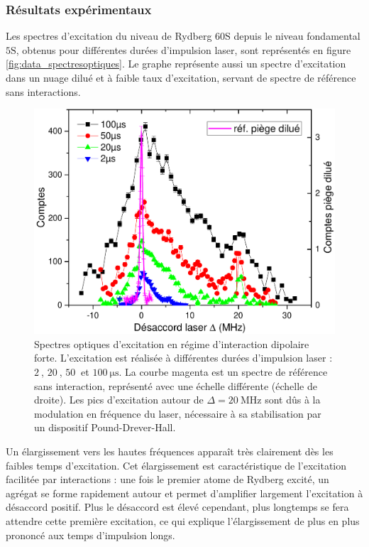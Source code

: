 		\subsubsection*{Résultats expérimentaux}
\noindent Les spectres d'excitation du niveau de Rydberg $\mathrm{60S}$ depuis le niveau fondamental $\mathrm{5S}$, obtenus pour différentes durées d'impulsion laser, sont représentés en figure \eqref{fig:data_spectresoptiques}.
Le graphe représente aussi un spectre d'excitation dans un nuage dilué et à faible taux d'excitation, servant de spectre de référence sans interactions.
%
\begin{figure}[!h]
\centering
\includegraphics[width=.85\linewidth]{figures/low_l/data_spectres_optiques}
\caption[Spectres optiques d'excitation en régime d'interaction dipolaire forte]{Spectres optiques d'excitation en régime d'interaction dipolaire forte.
L'excitation est réalisée à différentes durées d'impulsion laser : $\SI{2}{}$, $\SI{20}{}$, $\SI{50}{}$ et $\SI{100}{\us}$.
La courbe magenta est un spectre de référence sans interaction, représenté avec une échelle différente (échelle de droite).
Les pics d'excitation autour de $\Delta = \SI{20}{\MHz}$ sont dûs à la modulation en fréquence du laser, nécessaire à sa stabilisation par un dispositif Pound-Drever-Hall.
}
\label{fig:data_spectresoptiques}
\end{figure}
%
Un élargissement vers les hautes fréquences apparaît très clairement dès les faibles temps d'excitation.
Cet élargissement est caractéristique de l'excitation facilitée par interactions :
une fois le premier atome de Rydberg excité, un agrégat se forme rapidement autour et permet d'amplifier largement l'excitation à désaccord positif.
Plus le désaccord est élevé cependant, plus longtemps se fera attendre cette première excitation, ce qui explique l'élargissement de plus en plus prononcé aux temps d'impulsion longs.

